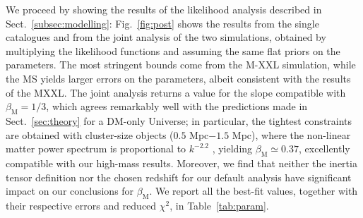 \documentclass[a4paper,11pt]{article}
\begin{document}
We proceed by showing the results of the likelihood analysis described in Sect.~\ref{subsec:modelling}: 
Fig.~\ref{fig:post}\protect{} shows the results from the single catalogues and from the joint analysis of the two simulations, obtained by multiplying the likelihood functions and assuming the same flat priors on the parameters. The most stringent bounds come from the M-XXL simulation, while the MS yields larger errors on the parameters, albeit consistent with the results of the MXXL. The joint analysis returns a value for the slope compatible with $\beta_{\mathrm{M}} = 1/3$, which agrees remarkably well with the predictions made in Sect.~\ref{sec:theory} for a DM-only Universe; in particular, the tightest constraints are obtained with cluster-size objects ($0.5$ Mpc$-1.5$ Mpc), where the non-linear matter power spectrum is proportional to $k^{-2.2}$ \cite{Blasetal2011}, yielding $\beta_{\mathrm{M}} \simeq 0.37$, excellently compatible with our high-mass results. Moreover, we find that neither the inertia tensor definition nor the chosen redshift for our default analysis have significant impact on our conclusions for $\beta_{\mathrm{M}}$. We report all the best-fit values, together with their respective errors and reduced $\chi^2$, in Table~\ref{tab:param}.
\end{document}
